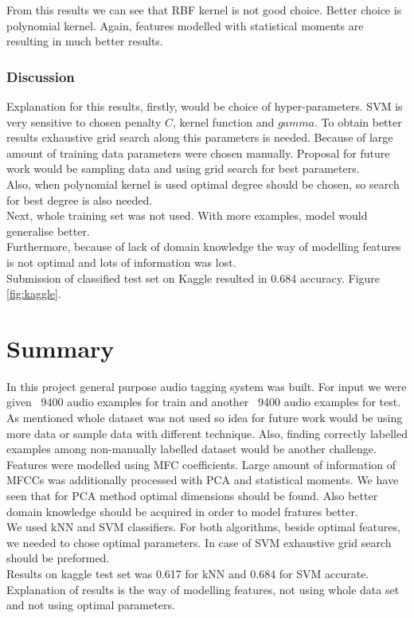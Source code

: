 \documentclass{article}
\begin{document}
From this results we can see that RBF kernel is not good choice. Better choice is polynomial kernel. Again,
features modelled with statistical moments are resulting in much better results.\\

\subsubsection{Discussion}
Explanation for this results, firstly, would be choice of hyper-parameters. SVM is very sensitive to chosen penalty $C$, kernel
function and $gamma$. To obtain better results exhaustive grid search along this parameters is needed. Because
of large amount of training data parameters were chosen manually. Proposal for future work would be sampling data and using 
grid search for best parameters.\\
Also, when polynomial kernel is used optimal degree should be chosen, so search for best degree is also needed.\\
Next, whole training set was not used. With more examples, model would generalise better.\\
Furthermore, because of lack of domain knowledge the way of modelling features is not optimal and lots of information
was lost.\\
Submission of classified test set on Kaggle resulted in 0.684 accuracy. Figure \ref{fig:kaggle}.


\section{Summary}
In this project general purpose audio tagging system was built. For input we were given ~9400 audio examples for train and
another ~9400 audio examples for test. As mentioned whole dataset was not used so idea for future work would be using more data
or sample data with different technique. Also, finding correctly labelled examples among non-manually labelled dataset would be
another challenge.\\
Features were modelled using MFC coefficients. Large amount of information of MFCCs was additionally processed with PCA and
statistical moments. We have seen that for PCA method optimal dimensions should be found. Also better domain knowledge should be 
acquired in order to model fratures better.\\
We used kNN and SVM classifiers. For both algorithms, beside optimal features, we needed to chose optimal parameters. In case
of SVM exhaustive grid search should be preformed.\\
Results on kaggle test set was 0.617 for kNN and 0.684 for SVM accurate. Explanation of results is the way of modelling 
features, not using whole data set and not using optimal parameters.\\ 
\end{document}
